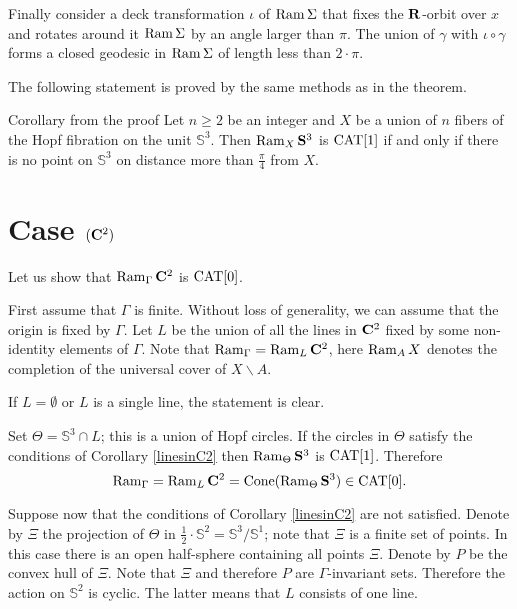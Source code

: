\documentclass{compositio}
\begin{document}
Finally consider a deck transformation
$\iota$ of $\mathop{\rm Ram}\nolimits \Sigma$ that fixes  the $\mathbf{R}$-orbit over $x$
and rotates around it $\mathop{\rm Ram}\nolimits \Sigma$ by an angle larger than $\pi$.
The union of $\gamma$ with $\iota\circ\gamma$ forms a closed geodesic in
$\mathop{\rm Ram}\nolimits \Sigma$ of length less than $2{\cdot}\pi$.
\qeds

The following statement is proved by the same methods as in the theorem.

\begin{thm}{Corollary from the proof}\label{linesinC2} Let $n\ge 2$ be an integer
and $X$ be a union of $n$ fibers
 of the Hopf fibration on  the unit $\mathbb{S}^3$.
Then $\mathop{\rm Ram}\nolimits_{X}\mathbf{S}^3$ is $\mathrm{CAT}[1]$ if and only if there is no point on $\mathbb{S}^3$ on distance more than $\frac{\pi}{4}$ from $X$.
\end{thm}





\section{Case $(\mathbf{C}^2)$} \label{pkspaces}

Let us show that $\mathop{\rm Ram}\nolimits_{\Gamma}\mathbf{C}^2$ is $\mathrm{CAT}[0]$.

First assume that $\Gamma$ is finite.
Without loss of generality, we can assume that the origin is fixed by $\Gamma$.
Let $L$ be the union of all the lines in $\mathbf{C}^2$
fixed by some non-identity elements of $\Gamma$.
Note that $\mathop{\rm Ram}\nolimits_{\Gamma}=\mathop{\rm Ram}\nolimits_{L}\mathbf{C}^2$,
here $\mathop{\rm Ram}\nolimits_AX$ denotes the completion of the universal cover of $X\backslash A$.

If $L=\emptyset$
or $L$ is a single line,
the statement is clear.

Set $\Theta=\mathbb{S}^3\cap L$; this
is a union of Hopf circles.
If the circles in $\Theta$
satisfy the conditions of
Corollary \ref{linesinC2} then $\mathop{\rm Ram}\nolimits_{\Theta} \mathbf{S}^3$ is $\mathrm{CAT}[1]$.
Therefore
\[\mathop{\rm Ram}\nolimits_\Gamma=\mathop{\rm Ram}\nolimits_L\mathbf{C}^2=\mathop{\rm Cone}\nolimits(\mathop{\rm Ram}\nolimits_{\Theta} \mathbf{S}^3)\in \mathrm{CAT}[0].\]


Suppose now that the conditions of
Corollary \ref{linesinC2} are not satisfied.
Denote by $\Xi$ the projection of $\Theta$ in $\tfrac12\cdot\mathbb{S}^2=\mathbb{S}^3/\mathbb{S}^1$;
note that $\Xi$ is a finite set of points.
In this case there is an open half-sphere containing all points $\Xi$.
Denote by $P$ be the convex hull of $\Xi$.
Note that $\Xi$ and therefore $P$ are $\Gamma$-invariant sets.
Therefore the action on $\mathbb{S}^2$ is cyclic.
The latter means that $L$ consists of one line.
\end{document}
